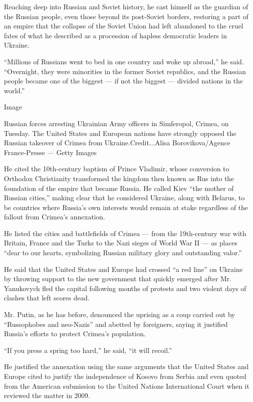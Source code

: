 Reaching deep into Russian and Soviet history, he cast himself as the
guardian of the Russian people, even those beyond its post-Soviet
borders, restoring a part of an empire that the collapse of the Soviet
Union had left abandoned to the cruel fates of what he described as a
procession of hapless democratic leaders in Ukraine.

``Millions of Russians went to bed in one country and woke up abroad,''
he said. ``Overnight, they were minorities in the former Soviet
republics, and the Russian people became one of the biggest --- if not
the biggest --- divided nations in the world.''

Image

Russian forces arresting Ukrainian Army officers in Simferopol, Crimea,
on Tuesday. The United States and European nations have strongly opposed
the Russian takeover of Crimea from Ukraine.Credit...Alisa
Borovikova/Agence France-Presse --- Getty Images

He cited the 10th-century baptism of Prince Vladimir, whose conversion
to Orthodox Christianity transformed the kingdom then known as Rus into
the foundation of the empire that became Russia. He called Kiev ``the
mother of Russian cities,'' making clear that he considered Ukraine,
along with Belarus, to be countries where Russia's own interests would
remain at stake regardless of the fallout from Crimea's annexation.

He listed the cities and battlefields of Crimea --- from the
19th-century war with Britain, France and the Turks to the Nazi sieges
of World War II --- as places ``dear to our hearts, symbolizing Russian
military glory and outstanding valor.''

He said that the United States and Europe had crossed ``a red line'' on
Ukraine by throwing support to the new government that quickly emerged
after Mr. Yanukovych fled the capital following months of protests and
two violent days of clashes that left scores dead.

Mr. Putin, as he has before, denounced the uprising as a coup carried
out by ``Russophobes and neo-Nazis'' and abetted by foreigners, saying
it justified Russia's efforts to protect Crimea's population.

``If you press a spring too hard,'' he said, ``it will recoil.''

He justified the annexation using the same arguments that the United
States and Europe cited to justify the independence of Kosovo from
Serbia and even quoted from the American submission to the United
Nations International Court when it reviewed the matter in 2009.

